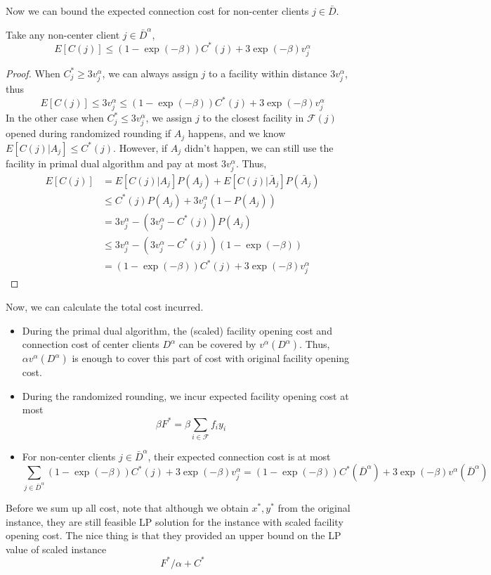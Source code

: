 Now we can bound the expected connection cost for non-center clients $j \in \bar D$.

\begin{lem}
Take any non-center client $j \in \bar D^\alpha$,
\[  E[C(j)] \le (1-\exp(-\beta)) C^*(j) + 3\exp(-\beta)v^\alpha_j \]
\end{lem}

\begin{proof}
When $C^*_j \ge 3 v^\alpha_j$, we can always assign $j$ to a facility within distance $3 v^\alpha_j$, thus
\[  E[C(j)] \le 3 v^\alpha_j \le (1-\exp(-\beta)) C^*(j) + 3\exp(-\beta)v^\alpha_j  \]
In the other case when $C^*_j \le 3 v^\alpha_j$, we assign $j$ to the closest facility in $\mathcal{F}(j)$
opened during randomized rounding if $A_j$ happens, and we know $E[C(j) | A_j] \le C^*(j)$.
However, if $A_j$ didn't happen, we can still use the facility in primal dual algorithm and pay at most $3v^\alpha_j$.
Thus,
\begin{align*}
E[C(j)] &= E[C(j)|A_j]P(A_j) + E[C(j)|\bar A_j]P(\bar A_j)  \\
&\le C^*(j)P(A_j) + 3v^\alpha_j (1 - P(A_j)) \\
&= 3v^\alpha_j - (3v^\alpha_j - C^*(j)) P(A_j) \\
&\le 3v^\alpha_j - (3v^\alpha_j - C^*(j)) (1 - \exp(-\beta)) \\
&= (1-\exp(-\beta)) C^*(j) + 3\exp(-\beta)v^\alpha_j
\end{align*}
\end{proof}

Now, we can calculate the total cost incurred.
\begin{itemize}
\item During the primal dual algorithm,
the (scaled) facility opening cost and connection cost of center clients $D^\alpha$
can be covered by $v^\alpha(D^\alpha)$. Thus, $\alpha v^\alpha(D^\alpha)$ is
enough to cover this part of cost with original facility opening cost.
\item During the randomized rounding, we incur expected facility opening cost
at most
\[ \beta F^* = \beta \sum_{i \in \mathcal{F}} f_i y_i \]
\item For non-center clients $j \in \bar D^\alpha$, their expected connection cost
is at most
\[  \sum_{j \in \bar D^\alpha} (1-\exp(-\beta)) C^*(j) + 3\exp(-\beta)v^\alpha_j = (1-\exp(-\beta)) C^*(\bar D^\alpha) + 3\exp(-\beta)v^\alpha(\bar D^\alpha) \]
\end{itemize}
Before we sum up all cost, note that although we obtain $x^*, y^*$ from the original instance,
they are still feasible LP solution for the instance with scaled facility opening cost.
The nice thing is that they provided an upper bound on the LP value of scaled instance
\[  F^*/\alpha + C^*    \]

